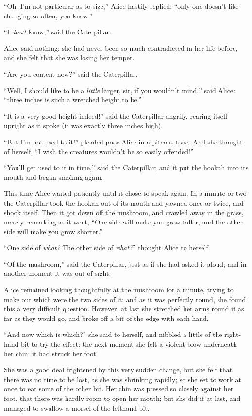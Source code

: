 \documentclass[11pt,openany,oneside]{book}
\begin{document}
“Oh, I’m not particular as to size,” Alice hastily replied; “only one doesn’t like changing so often, you know.” 

“I {\em don’t\/} know,” said the Caterpillar. 

Alice said nothing: she had never been so much contradicted in her life before, and she felt that she was losing her temper. 

“Are you content now?” said the Caterpillar. 

“Well, I should like to be a {\em little\/} larger, sir, if you wouldn’t mind,” said Alice: “three inches is such a wretched height to be.” 

“It is a very good height indeed!” said the Caterpillar angrily, rearing itself upright as it spoke (it was exactly three inches high). 

“But I’m not used to it!” pleaded poor Alice in a piteous tone. And she thought of herself, “I wish the creatures wouldn’t be so easily offended!” 

“You’ll get used to it in time,” said the Caterpillar; and it put the hookah into its mouth and began smoking again. 

This time Alice waited patiently until it chose to speak again. In a minute or two the Caterpillar took the hookah out of its mouth and yawned once or twice, and shook itself. Then it got down off the mushroom, and crawled away in the grass, merely remarking as it went, “One side will make you grow taller, and the other side will make you grow shorter.” 

“One side of {\em what?\/} The other side of {\em what?\/}” thought Alice to herself. 

“Of the mushroom,” said the Caterpillar, just as if she had asked it aloud; and in another moment it was out of sight. 

Alice remained looking thoughtfully at the mushroom for a minute, trying to make out which were the two sides of it; and as it was perfectly round, she found this a very difficult question. However, at last she stretched her arms round it as far as they would go, and broke off a bit of the edge with each hand. 

“And now which is which?” she said to herself, and nibbled a little of the right-hand bit to try the effect: the next moment she felt a violent blow underneath her chin: it had struck her foot! 

She was a good deal frightened by this very sudden change, but she felt that there was no time to be lost, as she was shrinking rapidly; so she set to work at once to eat some of the other bit. Her chin was pressed so closely against her foot, that there was hardly room to open her mouth; but she did it at last, and managed to swallow a morsel of the lefthand bit. 
\end{document}
